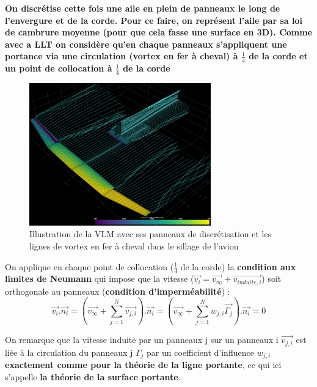 \textbf{On discrétise cette fois une aile en plein de panneaux le long de l'envergure et de la corde. Pour ce faire, on représent l'aile par sa loi de cambrure moyenne (pour que cela fasse une surface en 3D). Comme avec a LLT on considère qu'en chaque panneaux s'appliquent une portance via une circulation (vortex en fer à cheval) à $\frac{1}{4}$ de la corde et un point de collocation à $\frac{1}{4}$ de la corde}

\begin{figure}[H]
    \centering
    \includegraphics[width=0.7\textwidth]{Pics/01 - Basses Fidélités/vlm.png}
    \caption{Illustration de la VLM avec ses panneaux de discrétisation et les lignes de vortex en fer à cheval dans le sillage de l'avion}
    \label{fig:vlm}
\end{figure}

On applique en chaque point de collocation ($\frac{1}{4}$ de la corde) la \textbf{condition aux limites de Neumann} qui impose que la vitesse ($\overrightarrow{v_i} = \overrightarrow{v_{\infty}} + \overrightarrow{v_{induite,i}}$) soit orthogonale au panneaux (\textbf{condition d'imperméabilité}) :
\begin{equation}
    \overrightarrow{v_i}.\overrightarrow{n_i} = (\overrightarrow{v_{\infty}} + \sum_{j =1}^{N}\overrightarrow{v_{j,i}}).\overrightarrow{n_i} = (\overrightarrow{v_{\infty}} + \sum_{j =1}^{N}w_{j,i}\overrightarrow{\Gamma_j}).\overrightarrow{n_i} = 0
    \label{eq: Neumann boundary}
\end{equation}

On remarque que la vitesse induite par un panneaux j sur un panneaux i $\overrightarrow{v_{j,i}}$ est liée à la circulation du panneaux j $\Gamma_j$ par un coefficient d'influence $w_{j,i}$ \textbf{exactement comme pour la théorie de la ligne portante}, ce qui ici s'appelle \textbf{la théorie de la surface portante}.

